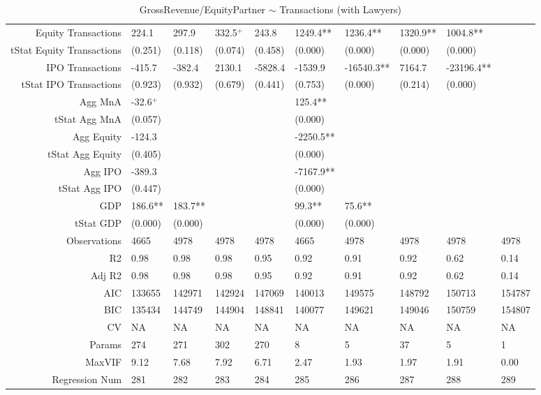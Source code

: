 \begin{table}[ht]
\begin{tabular}{rlllllllll}
  Equity Transactions & 224.1 & 297.9 & 332.5$^{+}$ & 243.8 & 1249.4** & 1236.4** & 1320.9** & 1004.8** &  \\ 
  tStat Equity Transactions & (0.251) & (0.118) & (0.074) & (0.458) & (0.000) & (0.000) & (0.000) & (0.000) &  \\ 
  IPO Transactions & -415.7 & -382.4 & 2130.1 & -5828.4 & -1539.9 & -16540.3** & 7164.7 & -23196.4** &  \\ 
  tStat IPO Transactions & (0.923) & (0.932) & (0.679) & (0.441) & (0.753) & (0.000) & (0.214) & (0.000) &  \\ 
  Agg MnA & -32.6$^{+}$ &  &  &  & 125.4** &  &  &  &  \\ 
  tStat Agg MnA & (0.057) &  &  &  & (0.000) &  &  &  &  \\ 
  Agg Equity & -124.3 &  &  &  & -2250.5** &  &  &  &  \\ 
  tStat Agg Equity & (0.405) &  &  &  & (0.000) &  &  &  &  \\ 
  Agg IPO & -389.3 &  &  &  & -7167.9** &  &  &  &  \\ 
  tStat Agg IPO & (0.447) &  &  &  & (0.000) &  &  &  &  \\ 
  GDP & 186.6** & 183.7** &  &  & 99.3** & 75.6** &  &  &  \\ 
  tStat GDP & (0.000) & (0.000) &  &  & (0.000) & (0.000) &  &  &  \\ 
  Observations & 4665 & 4978 & 4978 & 4978 & 4665 & 4978 & 4978 & 4978 & 4978 \\ 
  R2 & 0.98 & 0.98 & 0.98 & 0.95 & 0.92 & 0.91 & 0.92 & 0.62 & 0.14 \\ 
  Adj R2 & 0.98 & 0.98 & 0.98 & 0.95 & 0.92 & 0.91 & 0.92 & 0.62 & 0.14 \\ 
  AIC & 133655 & 142971 & 142924 & 147069 & 140013 & 149575 & 148792 & 150713 & 154787 \\ 
  BIC & 135434 & 144749 & 144904 & 148841 & 140077 & 149621 & 149046 & 150759 & 154807 \\ 
  CV & NA & NA & NA & NA & NA & NA & NA & NA & NA \\ 
  Params & 274 & 271 & 302 & 270 & 8 & 5 & 37 & 5 & 1 \\ 
  MaxVIF & 9.12 & 7.68 & 7.92 & 6.71 & 2.47 & 1.93 & 1.97 & 1.91 & 0.00 \\ 
  Regression Num & 281 & 282 & 283 & 284 & 285 & 286 & 287 & 288 & 289 \\ 
   \hline
\end{tabular}
\caption{GrossRevenue/EquityPartner $\sim$ Transactions (with Lawyers)} 
\end{table}
